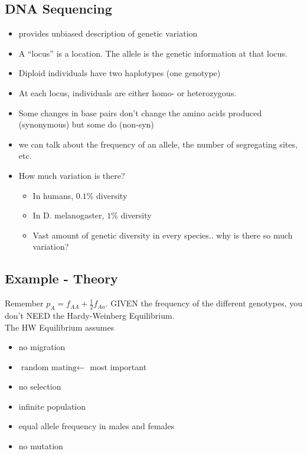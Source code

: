\documentclass{article}
\begin{document}
        \subsection{DNA Sequencing}
            \begin{itemize}
                \item provides unbiased description of genetic variation
                \item A ``locus'' is a location.  The allele is the genetic information at that locus.
                \item Diploid individuals have two haplotypes (one genotype)
                \item At each locus, individuals are either homo- or heterozygous.
                \item Some changes in base pairs don't change the amino acids produced (synonymous) but some do (non-syn)
                \item we can talk about the frequency of an allele, the number of segregating sites, etc.
                \item How much variation is there?
                \begin{itemize}
                    \item In humans, $0.1\%$ diversity
                    \item In D. melanogaster, $1\%$ diversity
                    \item Vast amount of genetic diversity in every species.. why is there so much variation?
                \end{itemize}
            \end{itemize}

        \subsection{Example - Theory}
            Remember $p_A = f_{AA} + \frac{1}{2}f_{Aa}$.  GIVEN the frequency of the different genotypes, you don't NEED the Hardy-Weinberg Equilibrium. \\

            The HW Equilibrium assumes
            \begin{itemize}
                \item no migration
                \item $\boxed{\text{random mating}} \leftarrow$ most important
                \item no selection
                \item infinite population
                \item equal allele frequency in males and females
                \item no mutation
            \end{itemize}
\end{document}
